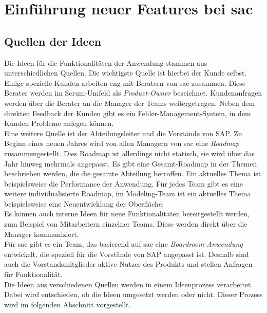 \section{Einführung neuer Features bei \ac{sac}}\label{sec:feature}

\subsection{Quellen der Ideen}
Die Ideen für die Funktionalitäten der Anwendung stammen aus unterschiedlichen Quellen. Die wichtigste Quelle ist hierbei der Kunde selbst. 
Einige spezielle Kunden arbeiten eng mit Beratern von \ac{sac} zusammen. Diese Berater werden im Scrum-Umfeld als \textit{Product-Owner} bezeichnet. 
Kundenanfragen werden über die Berater an die Manager der Teams weitergetragen. Neben dem direkten Feedback der Kunden gibt es ein 
Fehler-Management-System, in dem Kunden Probleme anlegen können.\\
Eine weitere Quelle ist der Abteilungsleiter und die Vorstände von SAP. Zu Beginn eines neuen Jahres wird von allen Managern von \ac{sac}
eine \textit{Roadmap} zusammengestellt. Dies Roadmap ist allerdings nicht statisch, sie wird über das Jahr hinweg mehrmals angepasst. 
Es gibt eine Gesamt-Roadmap in der Themen beschrieben werden, die die gesamte Abteilung betroffen. Ein aktuelles Thema ist beispielsweise
die Performance der Anwendung. Für jedes Team gibt es eine weitere individualisierte Roadmap, im Modeling-Team ist ein aktuelles Thema beispielsweise 
eine Neuentwicklung der Oberfläche.\\
Es können auch interne Ideen für neue Funktionalitäten bereitgestellt werden, zum Beispiel von Mitarbeitern einzelner Teams.
Diese werden direkt über die Manager kommuniziert.\\
Für \ac{sac} gibt es ein Team, das basierend auf \ac{sac} eine \textit{Boardroom-Anwendung} entwickelt, die speziell für die Vorstände von SAP angepasst ist.
Deshalb sind auch die Vorstandsmitglieder aktive Nutzer des Produkts und stellen Anfragen für Funktionalität.\\
Die Ideen aus verschiedenen Quellen werden in einem Ideenprozess verarbeitet. Dabei wird entschieden, ob die Ideen umgesetzt werden oder nicht. Dieser Prozess
wird im folgenden Abschnitt vorgestellt.

